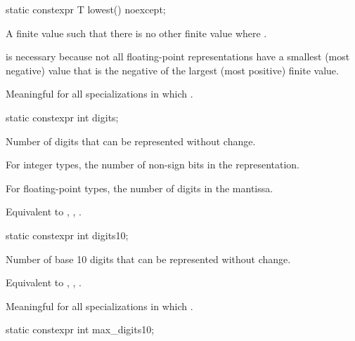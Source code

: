%
\begin{itemdecl}
static constexpr T lowest() noexcept;
\end{itemdecl}

\begin{itemdescr}
\pnum
A finite value  such that there is no other finite
value  where .
\begin{footnote}
 is necessary because not all
floating-point representations have a smallest (most negative) value that is
the negative of the largest (most positive) finite value.
\end{footnote}

\pnum
Meaningful for all specializations in which .
\end{itemdescr}

%
\begin{itemdecl}
static constexpr int digits;
\end{itemdecl}

\begin{itemdescr}
\pnum
Number of
digits that can be represented without change.

\pnum
For integer types, the number of non-sign bits in the representation.

\pnum
For floating-point types, the number of  digits in the
mantissa.
\begin{footnote}
Equivalent to , ,
.
\end{footnote}
\end{itemdescr}

%
\begin{itemdecl}
static constexpr int digits10;
\end{itemdecl}

\begin{itemdescr}
\pnum
Number of base 10 digits that can be represented without
change.
\begin{footnote}
Equivalent to , ,
.
\end{footnote}

\pnum
Meaningful for all specializations in which
.
\end{itemdescr}

%
\begin{itemdecl}
static constexpr int max_digits10;
\end{itemdecl}

